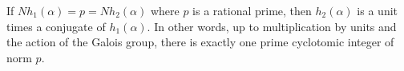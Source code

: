 If $Nh_1(\alpha) = p = Nh_2(\alpha)$ where $p$ is a rational prime, then $h_2(\alpha)$ is a unit times a conjugate of $h_1(\alpha)$. In other words, up to multiplication by units and the action of the Galois group, there is exactly one prime cyclotomic integer of norm $p$.
